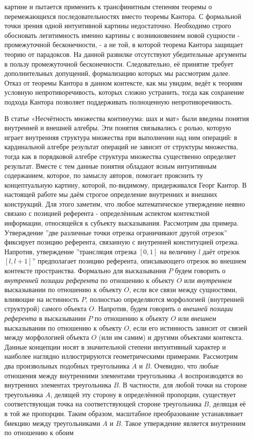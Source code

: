 \documentclass[12pt]{article}
\begin{document}
картине и пытается применить к трансфинитным степеням теоремы о перемежающихся последовательностях вместо теоремы Кантора. С формальной точки зрения одной интуитивной картины недостаточно. Необходимо строго обосновать легитимность именно картины с возникновением новой сущности - промежуточной бесконечности, - а не той, в которой теорема Кантора защищает теорию от парадоксов. На данной развилке отсутствуют убедительные аргументы в пользу промежуточной бесконечности. Следовательно, её принятие требует дополнительных допущений, формализацию которых мы рассмотрим далее. Отказ от теоремы Кантора в данном контексте, как мы увидим, ведёт к теориям условную непротиворечивость, которых сложно устранить, тогда как сохранение подхода Кантора позволяет поддерживать полноценную непротиворечивость.

В статье «Несчётность множества континуума: шах и мат» были введены понятия внутренней и внешней алгебры. Эти понятия связывались с ролью, которую играет внутренняя структура множества при выполнении над ним операций: в кардинальной алгебре результат операций не зависит от структуры множества, тогда как в порядковой алгебре структура множества существенно определяет результат. Вместе с тем данные понятия обладают ясным интуитивным содержанием, которое, по замыслу авторов, помогает прояснить ту концептуальную картину, которой, по-видимому, придерживался Георг Кантор. В настоящей работе мы даём строгое определение внутренних и внешних конструкций. Для этого заметим, что любое математическое утверждение неявно связано с позицией референта - определённым аспектом контекстной информации, относящейся к субъекту высказывания. Рассмотрим два примера. Утверждение ''две различные точки отрезка ограничивают другой отрезок'' фиксирует позицию референта, связанную с внутренней конституцией отрезка. Напротив, утверждение ''трансляция отрезка $[0, 1]$ на величину $l$ даёт отрезок $[l, l + 1]$'' предполагает позицию референта, описывающего отрезок во внешнем контексте пространства. Формально для высказывания $P$ будем говорить о {\it внутренней позиции референта} по отношению к объекту $O$ или {\it внутреннем} высказывании по отношению к объекту $O$, если все связи между сущностями, влияющие на истинность $P$, полностью определяются морфологией (внутренней структурой) самого объекта $O$. Напротив, будем говорить о {\it внешней позиции референта} в высказывании $P$ по отношению к объекту $O$ или {\it внешнем} высказывании по отношению к объекту $O$, если его истинность зависит от связей между морфологией объекта $O$ (или им самим) и другими объектами контекста. Данные концепции носят в значительной степени интуитивный характер и наиболее наглядно иллюстрируются геометрическими примерами. Рассмотрим два произвольных подобных треугольника $A$ и $B$. Очевидно, что любые отношения между внутренними элементами треугольника $A$ воспроизводятся во внутренних элементах треугольника $B$. В частности, для любой точки на стороне треугольника $A$, делящей эту сторону в определённой пропорции, существует соответствующая точка на соответствующей стороне треугольника $B$, делящая её в той же пропорции. Таким образом, масштабное преобразование устанавливает биекцию между треугольниками $A$ и $B$. Такое утверждение является внутренним по отношению к обоим 
\end{document}
